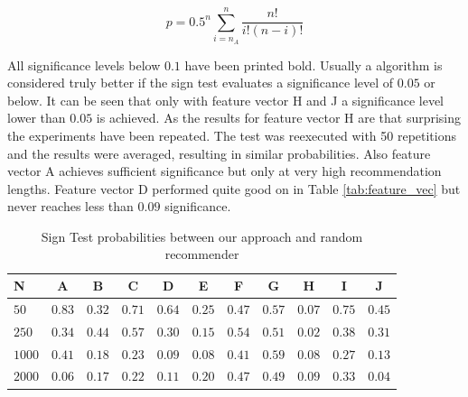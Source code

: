 \documentclass[cic,tc,english]{iiufrgs}
\begin{document}
\begin{equation} \label{form:sign-test}
p = 0.5^n \sum^n_{i = n_A} \frac{n!}{i!(n-i)!}
\end{equation}

All significance levels below $0.1$ have been printed bold. Usually a algorithm is considered truly better if the sign test evaluates a significance level of $0.05$ or below. It can be seen that only with feature vector H and J a significance level lower than $0.05$ is achieved. As the results for feature vector H are that surprising the experiments have been repeated. The test was reexecuted  with 50 repetitions and the results were averaged, resulting in similar probabilities. Also feature vector A achieves sufficient significance but only at very high recommendation lengths. Feature vector D performed quite good on in Table \ref{tab:feature_vec} but never reaches less than $0.09$ significance. 

\begin{table}
\center
\caption{Sign Test probabilities between our approach and random recommender}
\begin{tabular}{| l | c | c | c | c | c | c | c | c | c | c | }
\hline

\rowcolor{lightgray}  N & A & B & C & D & E & F & G & H & I & J  \\ \hline 
$50$		&	$0.83$	&	$0.32$	&	$0.71$	&	$0.64$	&	$0.25$	&	$0.47$	&	$0.57$	&	$\bm{0.07}$	&	$0.75$	&	$0.45$	\\ \hline 
$250$	&	$0.34$	&	$0.44$	&	$0.57$	&	$0.30$	&	$0.15$	&	$0.54$	&	$0.51$	&	$\bm{0.02}$	&	$0.38$	&	$0.31$	\\ \hline 
$1000$	&	$0.41$	&	$0.18$	&	$0.23$	&	$\bm{0.09}$	&	$\bm{0.08}$	&	$0.41$	&	$0.59$	&	$\bm{0.08}$	&	$0.27$	&	$0.13$	\\ \hline 
$2000$	&	$\bm{0.06}$	&	$0.17$	&	$0.22$	&	$0.11$	&	$0.20$	&	$0.47$	&	$0.49$	&	$\bm{0.09}$	&	$0.33$	&	$\bm{0.04}$	\\ \hline 

\end{tabular}
\label{tab:sign_test}
\end{table}
\end{document}

